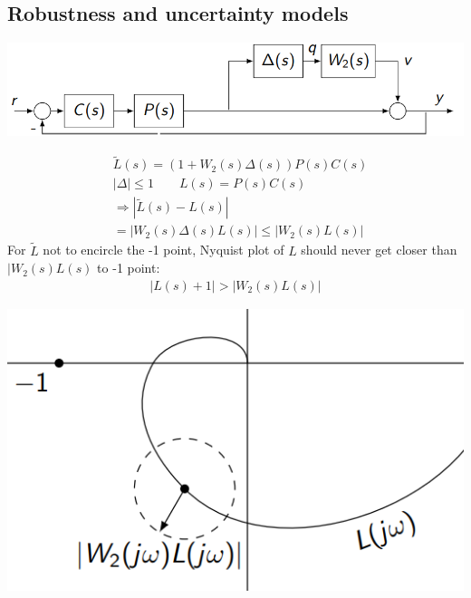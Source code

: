 \subsection{Robustness and uncertainty models}
    \includegraphics[width = \linewidth]{src/images/uncertainty_block_diagram.png}
    \begin{minipage}{0.58\linewidth}
        \begin{align*}
            &\tilde L(s) = (1 + W_2(s) \Delta(s)) P(s) C(s)\\
            &|\Delta| \leq 1 \quad \quad L(s) = P(s) C(s)\\
            &\Rightarrow |\tilde L(s) - L(s)|\\
            &= |W_2(s) \Delta(s) L(s)| \leq |W_2(s) L(s)|
        \end{align*}
        For $\tilde L$ not to encircle the -1 point, Nyquist plot of $L$ should never get closer than $|W_2(s) L(s)$ to -1 point:
        \begin{align*}
            |L(s) + 1| > |W_2(s) L(s)|
        \end{align*}
    \end{minipage}
    \begin{minipage}{0.40\linewidth}
        \includegraphics[width = \linewidth]{src/images/uncertainty_nyquist.png}
    \end{minipage}